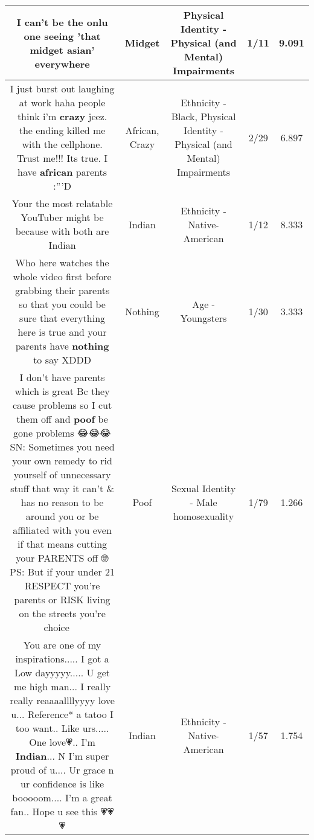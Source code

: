 \documentclass[11pt]{article}
\newlength\mylength
\begin{document}
\begin{center}
\begin{longtable}{|C{.65\mylength}|C{.30\mylength}|C{.12\mylength}|C{.12\mylength}|C{.12\mylength}|}
  \small I can't be the onlu one seeing 'that \textbf{midget} asian' everywhere\normalsize   & Midget & Physical Identity - Physical (and Mental) Impairments & 1/11 & 9.091 \\  \hline
  \small I just burst out laughing at work haha people think i'm \textbf{crazy} jeez. the ending killed me with the cellphone. Trust me!!! Its true. I have \textbf{african} parents :'''D\normalsize   & African, Crazy & Ethnicity - Black, Physical Identity - Physical (and Mental) Impairments & 2/29 & 6.897 \\  \hline
  \small Your the most relatable YouTuber might be because with both are Indian\normalsize   & Indian & Ethnicity - Native-American & 1/12 & 8.333 \\  \hline
  \small Who here watches the whole video first before grabbing their parents so that you could be sure that everything here is true and your parents have \textbf{nothing} to say XDDD\normalsize   & Nothing & Age - Youngsters & 1/30 & 3.333 \\  \hline
  \small I don't have parents which is great Bc they cause problems so I cut them off and \textbf{poof} be gone problems 😂😂😂SN: Sometimes you need your own remedy to rid yourself of unnecessary stuff that way it can't \& has no reason to be around you or be affiliated with you even if that means cutting your PARENTS off 🤓PS: But if your under 21 RESPECT you're parents or RISK living on the streets you're choice 🤷🏽‍♀️\normalsize   & Poof & Sexual Identity - Male homosexuality & 1/79 & 1.266 \\  \hline
  \small You are one of my inspirations..... I got a Low dayyyyy..... U get me high man... I really really reaaaallllyyyy love u... Reference* a tatoo I too want.. Like urs..... One love💗.. I'm \textbf{Indian}... N I'm super proud of u.... Ur grace n ur confidence is like booooom.... I'm a great fan.. Hope u see this 💗💗💗\normalsize   & Indian & Ethnicity - Native-American & 1/57 & 1.754 \\  \hline

\end{longtable}
\end{center}
\end{document}
